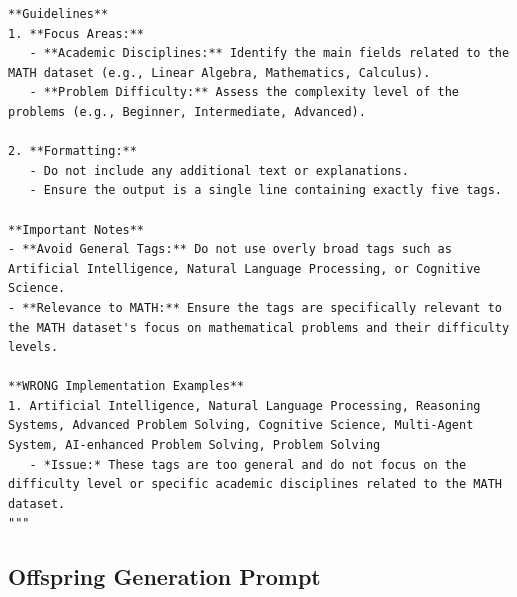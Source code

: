 \documentclass{article}
\theoremstyle{plain}
\theoremstyle{definition}
\theoremstyle{remark}
\begin{document}
\begin{tcolorbox}[notitle, sharp corners, breakable, colframe=Periwinkle, colback=white, 
       boxrule=3pt, boxsep=0.5pt, enhanced, 
       shadow={3pt}{-3pt}{0pt}{opacity=1,mygrey},
       title={Tag generation},]
{\begin{lstlisting}
**Guidelines**
1. **Focus Areas:**
   - **Academic Disciplines:** Identify the main fields related to the MATH dataset (e.g., Linear Algebra, Mathematics, Calculus).
   - **Problem Difficulty:** Assess the complexity level of the problems (e.g., Beginner, Intermediate, Advanced).

2. **Formatting:**
   - Do not include any additional text or explanations.
   - Ensure the output is a single line containing exactly five tags.

**Important Notes**
- **Avoid General Tags:** Do not use overly broad tags such as Artificial Intelligence, Natural Language Processing, or Cognitive Science.
- **Relevance to MATH:** Ensure the tags are specifically relevant to the MATH dataset's focus on mathematical problems and their difficulty levels.

**WRONG Implementation Examples**
1. Artificial Intelligence, Natural Language Processing, Reasoning Systems, Advanced Problem Solving, Cognitive Science, Multi-Agent System, AI-enhanced Problem Solving, Problem Solving
   - *Issue:* These tags are too general and do not focus on the difficulty level or specific academic disciplines related to the MATH dataset.
"""
\end{lstlisting}
}
\end{tcolorbox}


\subsection{Offspring Generation Prompt}\label{app:prompt_generate}
\end{document}
